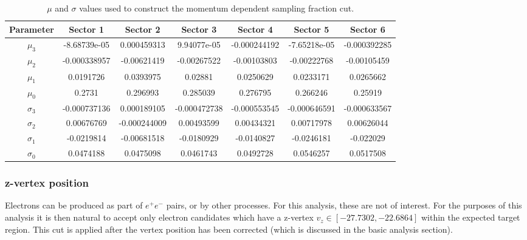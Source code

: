 \begin{landscape}
\begin{table}[h]
  \centering 

  \begin{tabular}{c | c | c | c | c | c | c}
    Parameter & Sector 1 & Sector 2 & Sector 3 & Sector 4 & Sector 5 & Sector 6                           \\
    \hline
    $\mu_3$     & -8.68739e-05 & 0.000459313  &  9.94077e-05 & -0.000244192 & -7.65218e-05 & -0.000392285  \\
    $\mu_2$     & -0.000338957 & -0.00621419  & -0.00267522  & -0.00103803  & -0.00222768  & -0.00105459   \\
    $\mu_1$     &  0.0191726   &  0.0393975   &  0.02881     &  0.0250629   &  0.0233171   &  0.0265662    \\
    $\mu_0$     &  0.2731      &  0.296993    &  0.285039    &  0.276795    &  0.266246    &  0.25919      \\
    $\sigma_3$  & -0.000737136 &  0.000189105 & -0.000472738 & -0.000553545 & -0.000646591 & -0.000633567  \\
    $\sigma_2$  &  0.00676769  & -0.000244009 &  0.00493599  &  0.00434321  &  0.00717978  &  0.00626044   \\
    $\sigma_1$  & -0.0219814   & -0.00681518  & -0.0180929   & -0.0140827   & -0.0246181   & -0.022029     \\
    $\sigma_0$  &  0.0474188   &  0.0475098   &  0.0461743   &  0.0492728   &  0.0546257   &  0.0517508    
  \end{tabular}
  \caption{$\mu$ and $\sigma$ values used to construct the momentum dependent sampling fraction cut.}
  \label{table-sampling-fraction}
\end{table}
\end{landscape}

\subsubsection{z-vertex position}
Electrons can be produced as part of $e^+ e^-$ pairs, or by other processes.  For this analysis, these are not of interest.  For the purposes of this analysis it is then natural to accept only electron candidates which have a z-vertex $v_z \in [-27.7302, -22.6864]$ within the expected target region.  This cut is applied after the vertex position has been corrected (which is discussed in the basic analysis section).


